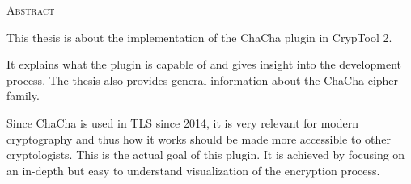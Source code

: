 \begin{center}
  \textsc{Abstract}
\end{center}

\noindent
This thesis is about the implementation of the ChaCha plugin in CrypTool 2.

\medskip
\noindent
It explains what the plugin is capable of and gives insight into the development process. The thesis also provides general information about the ChaCha cipher family.

\medskip
\noindent
Since ChaCha is used in TLS since 2014, it is very relevant for modern cryptography and thus how it works should be made more accessible to other cryptologists. This is the actual goal of this plugin. It is achieved by focusing on an in-depth but easy to understand visualization of  the encryption process.

